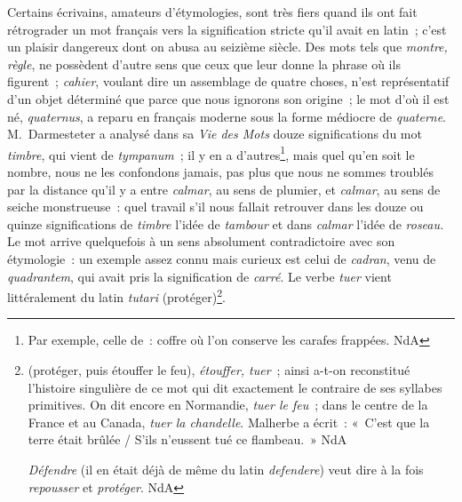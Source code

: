 \documentclass[french,twoside]{book} %
\begin{document}
Certains écrivains, amateurs d’étymologies, sont très fiers quand ils ont fait rétrograder un mot français vers la signification stricte qu’il avait en latin ; c’est un plaisir dangereux dont on abusa au seizième siècle. Des mots tels que {\itshape montre, règle}, ne possèdent d’autre sens que ceux que leur donne la phrase où ils figurent ; {\itshape cahier}, voulant dire un assemblage de quatre choses, n’est représentatif d’un objet déterminé que parce que nous ignorons son origine ; le mot d’où il est né, {\itshape quaternus}, a reparu en français moderne sous la forme médiocre de {\itshape quaterne}. M. Darmesteter a analysé dans sa {\itshape Vie des Mots} douze significations du mot {\itshape timbre}, qui vient de {\itshape tympanum} ; il y en a d’autres\footnote{Par exemple, celle de : coffre où l’on conserve les carafes frappées. NdA}, mais quel qu’en soit le nombre, nous ne les confondons jamais, pas plus que nous ne sommes troublés par la distance qu’il y a entre {\itshape calmar}, au sens de plumier, et {\itshape calmar}, au sens de seiche monstrueuse : quel travail s’il nous fallait retrouver dans les douze ou quinze significations de {\itshape timbre} l’idée de {\itshape tambour} et dans {\itshape calmar} l’idée de {\itshape roseau.} Le mot arrive quelquefois à un sens absolument contradictoire avec son étymologie : un exemple assez connu mais curieux est celui de {\itshape cadran}, venu de {\itshape quadrantem}, qui avait pris la signification de {\itshape carré}. Le verbe {\itshape tuer} vient littéralement du latin {\itshape tutari} (protéger)\footnote{ (protéger, puis étouffer le feu), {\itshape étouffer, tuer} ; ainsi a-t-on reconstitué l’histoire singulière de ce mot qui dit exactement le contraire de ses syllabes primitives. On dit encore en Normandie, {\itshape tuer le feu} ; dans le centre de la France et au Canada, {\itshape tuer la chandelle}. Malherbe a écrit : « C’est que la terre était brûlée / S’ils n’eussent tué ce flambeau. » NdA\par
 {\itshape Défendre} (il en était déjà de même du latin {\itshape defendere}) veut dire à la fois {\itshape repousser} et {\itshape protéger}. NdA
}.\par
\end{document}
